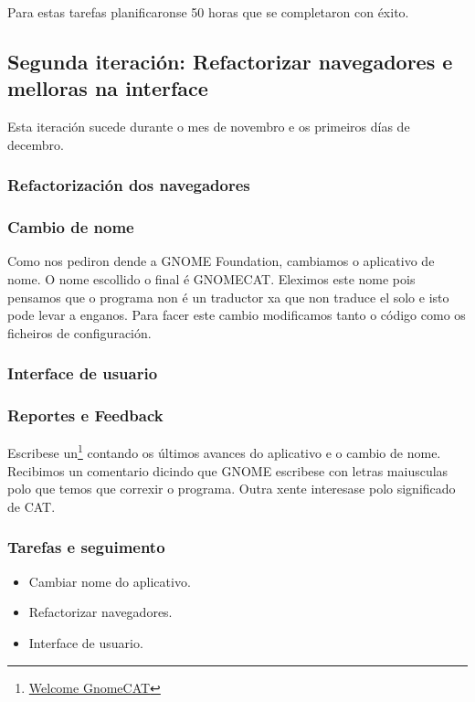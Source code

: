 Para estas tarefas planificaronse 50 horas que se completaron con éxito.

\subsection{Segunda iteración: Refactorizar navegadores e melloras na interface}
Esta iteración sucede durante o mes de novembro e os primeiros días de decembro.

\subsubsection{Refactorización dos navegadores}

\subsubsection{Cambio de nome}
Como nos pediron dende a GNOME Foundation, cambiamos o aplicativo de nome. O nome escollido o final é GNOMECAT. Eleximos este nome pois pensamos que o programa non é un traductor xa que non traduce el solo e isto pode levar a enganos. Para facer este cambio modificamos tanto o código como os ficheiros de configuración.

\subsubsection{Interface de usuario}

\subsubsection{Reportes e Feedback}
Escribese un\footnote{\href{http://aquelando.info/welcome-gnomecat/}{Welcome GnomeCAT}} contando os últimos avances do aplicativo e o cambio de nome. Recibimos un comentario dicindo que GNOME escribese con letras maiusculas polo que temos que correxir o programa. Outra xente interesase polo significado de CAT.

\subsubsection{Tarefas e seguimento}

\begin{itemize}
  \item Cambiar nome do aplicativo.
  \item Refactorizar navegadores.
  \item Interface de usuario.
\end{itemize}

